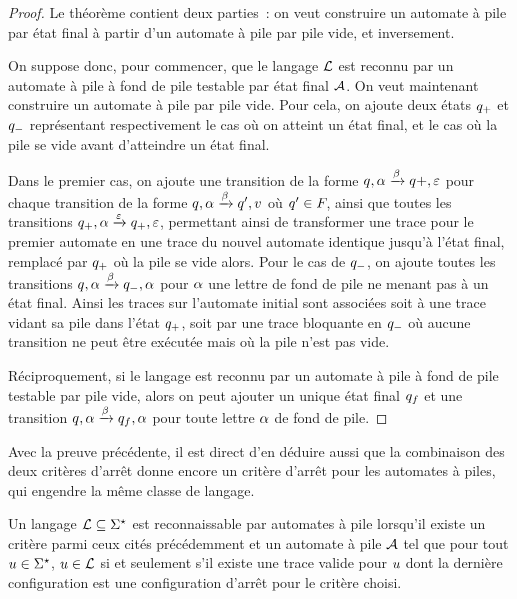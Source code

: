 \begin{proof}
  Le théorème contient deux parties~: on veut construire un automate à pile par
  état final à partir d'un automate à pile par pile vide, et inversement.

  On suppose donc, pour commencer, que le langage $\mathcal L$ est reconnu par un
  automate à pile à fond de pile testable par état final $\mathcal{A}$. On veut
  maintenant construire un automate à pile par pile vide. Pour cela, on ajoute
  deux états $q_{+}$ et $q_{-}$ représentant respectivement le cas où on
  atteint un état final, et le cas où la pile se vide avant d'atteindre un état
  final.

  Dans le premier cas, on ajoute une transition de la forme
  $q_{},\alpha\xrightarrow{\beta}q_{}{+},\varepsilon$ pour chaque transition de la
  forme $q_{},\alpha\xrightarrow{\beta} q_{}',v$ où $q_{}' \in F_{}$,
  ainsi que toutes les transitions
  $q_{+},\alpha \xrightarrow{\varepsilon} q_{+},\varepsilon$,
  permettant ainsi de transformer une trace pour le premier automate en une
  trace du nouvel automate identique jusqu'à l'état final, remplacé par
  $q_{+}$ où la pile se vide alors.
  Pour le cas de $q_{-}$, on ajoute toutes les transitions
  $q_{},\alpha \xrightarrow{\beta} q_{-},\alpha$ pour $\alpha$ une lettre
  de fond de pile ne menant pas à un état final. Ainsi les traces sur l'automate
  initial sont associées soit à une trace vidant sa pile dans l'état
  $q_{+}$, soit par une trace bloquante en $q_{-}$ où aucune transition
  ne peut être exécutée mais où la pile n'est pas vide.

  Réciproquement, si le langage est reconnu par un automate à pile à fond de
  pile testable par pile vide, alors on peut ajouter un unique état final
  $q_{f}$ et une transition
  $q_{},\alpha\xrightarrow{\beta} q_{f},\alpha$ pour toute lettre
  $\alpha$ de fond de pile.
\end{proof}

\begin{remark}
  Avec la preuve précédente, il est direct d'en déduire aussi que la combinaison
  des deux critères d'arrêt donne encore un critère d'arrêt pour les automates
  à piles, qui engendre la même classe de langage.
\end{remark}

\begin{definition}
  Un langage $\mathcal L \subseteq \Sigma^{\star}$ est reconnaissable par automates à pile
  lorsqu'il existe un critère parmi ceux cités précédemment et un automate à
  pile $\mathcal{A}$ tel que pour tout $u \in \Sigma^{\star}$, $u \in \mathcal L$ si
  et seulement s'il existe une trace valide pour $u$ dont la dernière
  configuration est une configuration d'arrêt pour le critère choisi.
\end{definition}

